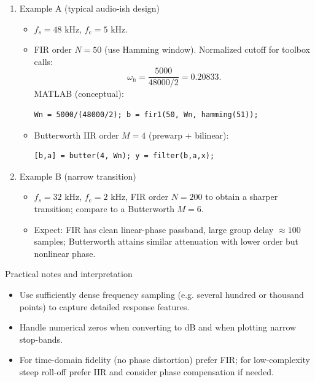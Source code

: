 \documentclass[11pt]{article}
\begin{document}
\begin{enumerate}
    \item Example A (typical audio-ish design)
          \begin{itemize}
              \item $f_s=48\text{ kHz}$, $f_\mathrm{c}=5\text{ kHz}$.
              \item FIR order $N=50$ (use Hamming window). Normalized cutoff for toolbox calls:
                    \[
                        \omega_\mathrm{n}=\frac{5000}{48000/2}=0.20833.
                    \]
                    MATLAB (conceptual):
                    \begin{verbatim}
Wn = 5000/(48000/2); b = fir1(50, Wn, hamming(51));
        \end{verbatim}
              \item Butterworth IIR order $M=4$ (prewarp + bilinear):
                    \begin{verbatim}
[b,a] = butter(4, Wn); y = filter(b,a,x);
        \end{verbatim}
          \end{itemize}

    \item Example B (narrow transition)
          \begin{itemize}
              \item $f_s=32\text{ kHz}$, $f_\mathrm{c}=2\text{ kHz}$, FIR order $N=200$ to obtain a sharper transition; compare to a Butterworth $M=6$.
              \item Expect: FIR has clean linear-phase passband, large group delay $\approx100$ samples; Butterworth attains similar attenuation with lower order but nonlinear phase.
          \end{itemize}
\end{enumerate}

\bigskip

\noindent Practical notes and interpretation
\begin{itemize}
    \item Use sufficiently dense frequency sampling (e.g. several hundred or thousand points) to capture detailed response features.
    \item Handle numerical zeros when converting to dB and when plotting narrow stop-bands.
    \item For time-domain fidelity (no phase distortion) prefer FIR; for low-complexity steep roll-off prefer IIR and consider phase compensation if needed.
\end{itemize}
\end{document}
